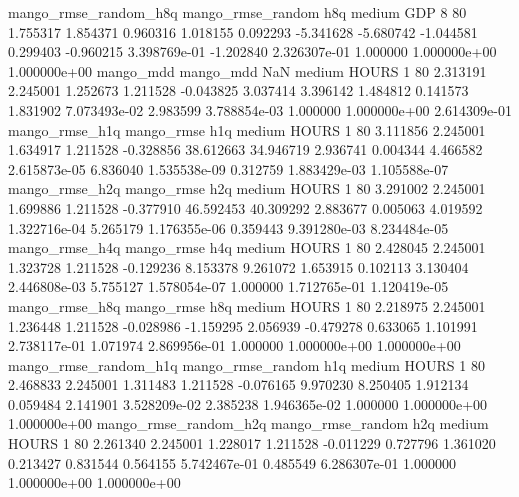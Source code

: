 mango_rmse_random_h8q mango_rmse_random                  h8q     medium      GDP                 8 80  1.755317       1.854371 0.960316       1.018155    0.092293     -5.341628     -5.680742    -1.044581       0.299403 -0.960215 3.398769e-01    -1.202840   2.326307e-01            1.000000    1.000000e+00        1.000000e+00
            mango_mdd         mango_mdd                  NaN     medium    HOURS                 1 80  2.313191       2.245001 1.252673       1.211528   -0.043825      3.037414      3.396142     1.484812       0.141573  1.831902 7.073493e-02     2.983599   3.788854e-03            1.000000    1.000000e+00        2.614309e-01
       mango_rmse_h1q        mango_rmse                  h1q     medium    HOURS                 1 80  3.111856       2.245001 1.634917       1.211528   -0.328856     38.612663     34.946719     2.936741       0.004344  4.466582 2.615873e-05     6.836040   1.535538e-09            0.312759    1.883429e-03        1.105588e-07
       mango_rmse_h2q        mango_rmse                  h2q     medium    HOURS                 1 80  3.291002       2.245001 1.699886       1.211528   -0.377910     46.592453     40.309292     2.883677       0.005063  4.019592 1.322716e-04     5.265179   1.176355e-06            0.359443    9.391280e-03        8.234484e-05
       mango_rmse_h4q        mango_rmse                  h4q     medium    HOURS                 1 80  2.428045       2.245001 1.323728       1.211528   -0.129236      8.153378      9.261072     1.653915       0.102113  3.130404 2.446808e-03     5.755127   1.578054e-07            1.000000    1.712765e-01        1.120419e-05
       mango_rmse_h8q        mango_rmse                  h8q     medium    HOURS                 1 80  2.218975       2.245001 1.236448       1.211528   -0.028986     -1.159295      2.056939    -0.479278       0.633065  1.101991 2.738117e-01     1.071974   2.869956e-01            1.000000    1.000000e+00        1.000000e+00
mango_rmse_random_h1q mango_rmse_random                  h1q     medium    HOURS                 1 80  2.468833       2.245001 1.311483       1.211528   -0.076165      9.970230      8.250405     1.912134       0.059484  2.141901 3.528209e-02     2.385238   1.946365e-02            1.000000    1.000000e+00        1.000000e+00
mango_rmse_random_h2q mango_rmse_random                  h2q     medium    HOURS                 1 80  2.261340       2.245001 1.228017       1.211528   -0.011229      0.727796      1.361020     0.213427       0.831544  0.564155 5.742467e-01     0.485549   6.286307e-01            1.000000    1.000000e+00        1.000000e+00
